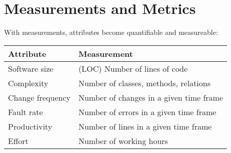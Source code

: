 \section{Measurements and Metrics}
With measurements, attributes become quantifiable and measureable:\\[2ex]
\begin{tabularx}{\linewidth}{|l|X|}
\hline
Attribute & Measurement \\
\hline
Software size & (LOC) Number of lines of code\\
Complexity & Number of classes, methods, relations\\
Change frequency & Number of changes in a given time frame\\
Fault rate & Number of errors in a given time frame\\
Productivity & Number of lines in a given time frame \\
Effort & Number of working hours \\
\hline
\end{tabularx}
